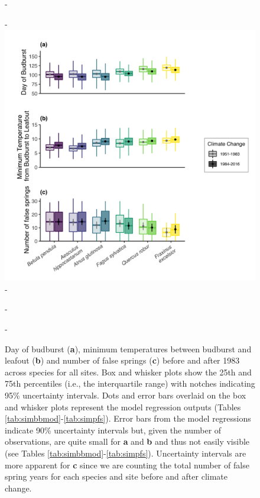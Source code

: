\documentclass{article}\usepackage[]{graphicx}\usepackage[]{color}
\begin{document}
{\begin{figure} [H]
  -\begin{center}
  -\includegraphics[width=14cm]{..//..//analyses/figures/Boxplot_BBTminFS_noDots_modestslong.png}
  -\caption{Day of budburst (\textbf{a}), minimum temperatures between budburst and leafout (\textbf{b}) and number of false springs (\textbf{c}) before and after 1983 across species for all sites. Box and whisker plots show the 25th and 75th percentiles (i.e., the interquartile range) with notches indicating 95\% uncertainty intervals. Dots and error bars overlaid on the box and whisker plots represent the model regression outputs (Tables \ref{tab:simbbmod}-\ref{tab:simpfs}). Error bars from the model regressions indicate 90\% uncertainty intervals but, given the number of observations, are quite small for \textbf{a} and \textbf{b} and thus not easily visible (see Tables \ref{tab:simbbmod}-\ref{tab:simpfs}). Uncertainty intervals are more apparent for \textbf{c} since we are counting the total number of false spring years for each species and site before and after climate change.  }\label{fig:boxfs}
  -\end{center}
  -\end{figure}}
  
\end{document}
